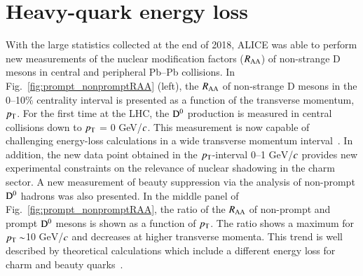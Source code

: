 \documentclass[3p,times,procedia]{elsarticle}
\newcommand{\GeV}{\mathrm{GeV}}
\newcommand{\pt}{p_{\rm T}}
\newcommand{\Dzero}{{\rm D^0}}
\newcommand{\RAA}{R_{\rm AA}}
\begin{document}
\section{Heavy-quark energy loss}
\label{eloss}
With the large statistics collected at the end of 2018, ALICE was able to perform new measurements of the nuclear modification factors ($\RAA$) of 
non-strange D mesons in central and peripheral Pb--Pb collisions. In Fig.~\ref{fig:prompt_nonpromptRAA} (left), the $\RAA$ of non-strange D mesons in the 0--10$\%$ 
centrality interval is presented as a function of the transverse momentum, $\pt$. For the first time at the LHC, the $\Dzero$ production is measured 
in central collisions down to $\pt$ = 0 GeV/$\it{c}$. This measurement is now capable of challenging energy-loss calculations in a wide 
transverse momentum interval~\cite{bamps,tamu,phsd,sHQ,catania}. In addition, the new data point obtained in the $\pt$-interval 0--1 $\GeV$/$\it{c}$ 
provides new experimental constraints on the relevance of 
nuclear shadowing in the charm sector. A new measurement of beauty suppression via the analysis of non-prompt $\Dzero$ hadrons 
was also presented. In the middle panel of Fig.~\ref{fig:prompt_nonpromptRAA}, the ratio of the $\RAA$ of non-prompt and prompt $\Dzero$ mesons is shown
as a function of $\pt$. The ratio shows a maximum for $\pt \sim$10 $\GeV$/$\it{c}$ and decreases at higher transverse momenta. This trend is well 
described by theoretical calculations which include a different energy loss for charm and beauty quarks~\cite{tamu,sHQ,cujet3}. 
\end{document}
